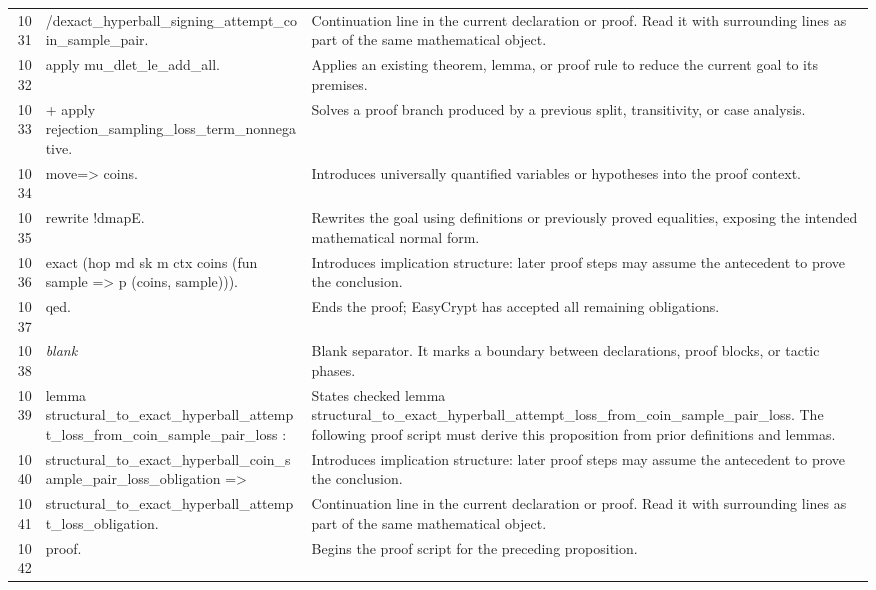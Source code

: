 \documentclass[10pt]{article}
\begin{document}
\begin{longtable}{r L{0.53\textwidth} L{0.37\textwidth}}
1031 & {\ttfamily\scriptsize         /dexact\_hyperball\_signing\_attempt\_coin\_sample\_pair.} & Continuation line in the current declaration or proof.  Read it with surrounding lines as part of the same mathematical object. \\
1032 & {\ttfamily\scriptsize apply mu\_dlet\_le\_add\_all.} & Applies an existing theorem, lemma, or proof rule to reduce the current goal to its premises. \\
1033 & {\ttfamily\scriptsize + apply rejection\_sampling\_loss\_term\_nonnegative.} & Solves a proof branch produced by a previous split, transitivity, or case analysis. \\
1034 & {\ttfamily\scriptsize move=> coins.} & Introduces universally quantified variables or hypotheses into the proof context. \\
1035 & {\ttfamily\scriptsize rewrite !dmapE.} & Rewrites the goal using definitions or previously proved equalities, exposing the intended mathematical normal form. \\
1036 & {\ttfamily\scriptsize exact (hop md sk m ctx coins (fun sample => p (coins, sample))).} & Introduces implication structure: later proof steps may assume the antecedent to prove the conclusion. \\
1037 & {\ttfamily\scriptsize qed.} & Ends the proof; EasyCrypt has accepted all remaining obligations. \\
1038 & {\ttfamily\scriptsize \emph{blank}} & Blank separator.  It marks a boundary between declarations, proof blocks, or tactic phases. \\
1039 & {\ttfamily\scriptsize lemma structural\_to\_exact\_hyperball\_attempt\_loss\_from\_coin\_sample\_pair\_loss :} & States checked lemma structural\_to\_exact\_hyperball\_attempt\_loss\_from\_coin\_sample\_pair\_loss.  The following proof script must derive this proposition from prior definitions and lemmas. \\
1040 & {\ttfamily\scriptsize   structural\_to\_exact\_hyperball\_coin\_sample\_pair\_loss\_obligation =>} & Introduces implication structure: later proof steps may assume the antecedent to prove the conclusion. \\
1041 & {\ttfamily\scriptsize   structural\_to\_exact\_hyperball\_attempt\_loss\_obligation.} & Continuation line in the current declaration or proof.  Read it with surrounding lines as part of the same mathematical object. \\
1042 & {\ttfamily\scriptsize proof.} & Begins the proof script for the preceding proposition. \\

\end{longtable}
\end{document}
